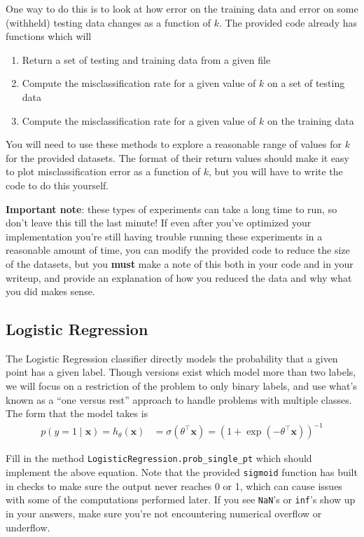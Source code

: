 \documentclass{article}
\begin{document}
One way to do this is to look at how error on the training data and error on some (withheld) testing data changes as a function of \(k\). The provided code already has functions which will
\begin{enumerate}
	\item Return a set of testing and training data from a given file
	\item Compute the misclassification rate for a given value of \(k\) on a set of testing data
	\item Compute the misclassification rate for a given value of \(k\) on the training data
\end{enumerate}

You will need to use these methods to explore a reasonable range of values for \(k\) for the provided datasets. The format of their return values should make it easy to plot misclassification error as a function of \(k\), but you will have to write the code to do this yourself.

\textbf{Important note}: these types of experiments can take a long time to run, so don't leave this till the last minute! If even after you've optimized your implementation you're still having trouble running these experiments in a reasonable amount of time, you can modify the provided code to reduce the size of the datasets, but you \textbf{must} make a note of this both in your code and in your writeup, and provide an explanation of how you reduced the data and why what you did makes sense.

\subsection*{Logistic Regression}

The Logistic Regression classifier directly models the probability that a given point has a given label. Though versions exist which model more than two labels, we will focus on a restriction of the problem to only binary labels, and use what's known as a ``one versus rest'' approach to handle problems with multiple classes. The form that the model takes is
\begin{align}
	p(y=1\mid\mathbf{x}) = h_\theta(\mathbf{x}) &= \sigma(\theta^\top\mathbf{x}) = \left( 1+\exp(-\theta^\top\mathbf{x}) \right)^{-1}
\end{align}

Fill in the method \texttt{LogisticRegression.prob\_single\_pt} which should implement the above equation. Note that the provided \texttt{sigmoid} function has built in checks to make sure the output never reaches 0 or 1, which can cause issues with some of the computations performed later. If you see \texttt{NaN}'s or \texttt{inf}'s show up in your answers, make sure you're not encountering numerical overflow or underflow.
\end{document}
